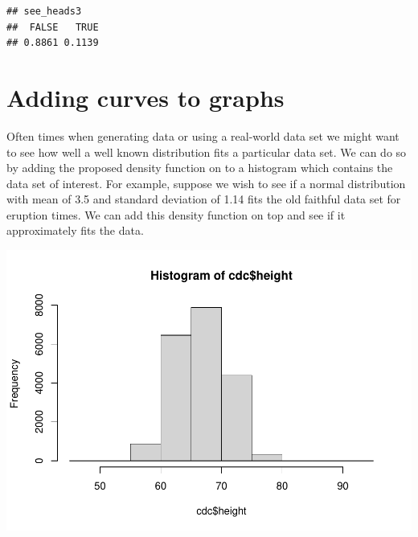 \documentclass[
]{book}
\newenvironment{Shaded}{\begin{snugshade}}{\end{snugshade}}
\newcommand{\DataTypeTok}[1]{\textcolor[rgb]{0.13,0.29,0.53}{#1}}
\newcommand{\DecValTok}[1]{\textcolor[rgb]{0.00,0.00,0.81}{#1}}
\newcommand{\FloatTok}[1]{\textcolor[rgb]{0.00,0.00,0.81}{#1}}
\newcommand{\KeywordTok}[1]{\textcolor[rgb]{0.13,0.29,0.53}{\textbf{#1}}}
\newcommand{\NormalTok}[1]{#1}
\newcommand{\OperatorTok}[1]{\textcolor[rgb]{0.81,0.36,0.00}{\textbf{#1}}}
\newcommand{\OtherTok}[1]{\textcolor[rgb]{0.56,0.35,0.01}{#1}}
\newcommand{\StringTok}[1]{\textcolor[rgb]{0.31,0.60,0.02}{#1}}
\begin{document}
\begin{verbatim}
## see_heads3
##  FALSE   TRUE 
## 0.8861 0.1139
\end{verbatim}

\hypertarget{adding-curves-to-graphs}{%
\section{Adding curves to graphs}\label{adding-curves-to-graphs}}

Often times when generating data or using a real-world data set we might want to see how well a well known distribution fits a particular data set. We can do so by adding the proposed density function on to a histogram which contains the data set of interest. For example, suppose we wish to see if a normal distribution with mean of 3.5 and standard deviation of 1.14 fits the old faithful data set for eruption times. We can add this density function on top and see if it approximately fits the data.

\begin{Shaded}
\end{Shaded}

\includegraphics{_main_files/figure-latex/unnamed-chunk-223-1.pdf}
\end{document}
